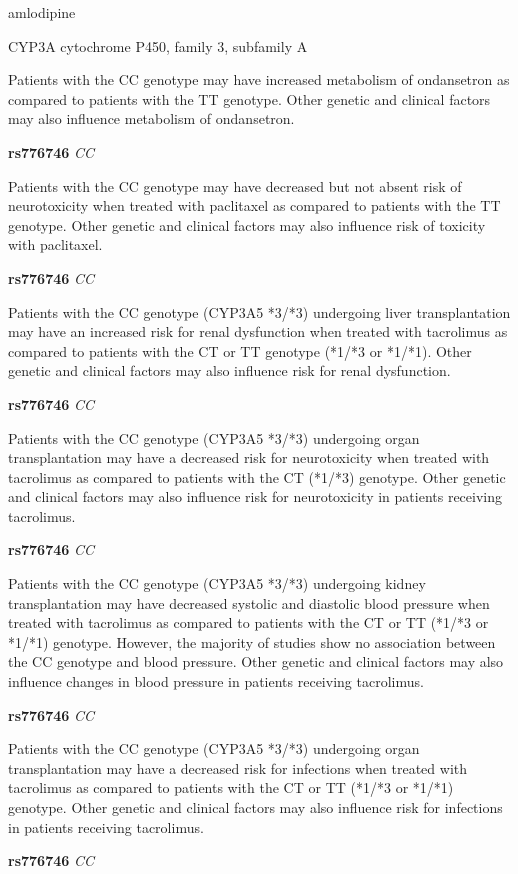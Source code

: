 \documentclass{resume} %
\begin{document}
\begin{rSection}{ amlodipine }
\begin{rSubsection}{ CYP3A }{ cytochrome P450, family 3, subfamily A }{}{}
\item[] Patients with the CC genotype may have increased metabolism of ondansetron as compared to patients with the TT genotype. Other genetic and clinical factors may also influence metabolism of ondansetron.\item \textbf{ rs776746 } \textit{ CC }
\item[] Patients with the CC genotype may have decreased but not absent risk of neurotoxicity when treated with paclitaxel as compared to patients with the TT genotype. Other genetic and clinical factors may also influence risk of toxicity with paclitaxel.\item \textbf{ rs776746 } \textit{ CC }
\item[] Patients with the CC genotype (CYP3A5 *3/*3) undergoing liver transplantation may have an increased risk for renal dysfunction when treated with tacrolimus as compared to patients with the CT or TT genotype (*1/*3 or *1/*1). Other genetic and clinical factors may also influence risk for renal dysfunction. \item \textbf{ rs776746 } \textit{ CC }
\item[] Patients with the CC genotype (CYP3A5 *3/*3) undergoing organ transplantation may have a decreased risk for neurotoxicity when treated with tacrolimus as compared to patients with the CT (*1/*3) genotype. Other genetic and clinical factors may also influence risk for neurotoxicity in patients receiving tacrolimus. \item \textbf{ rs776746 } \textit{ CC }
\item[] Patients with the CC genotype (CYP3A5 *3/*3) undergoing kidney transplantation may have decreased systolic and diastolic blood pressure when treated with tacrolimus as compared to patients with the CT or TT (*1/*3 or *1/*1) genotype. However, the majority of studies show no association between the CC genotype and blood pressure. Other genetic and clinical factors may also influence changes in blood pressure in patients receiving tacrolimus.\item \textbf{ rs776746 } \textit{ CC }
\item[] Patients with the CC genotype (CYP3A5 *3/*3) undergoing organ transplantation may have a decreased risk for infections when treated with tacrolimus as compared to patients with the CT or TT (*1/*3 or *1/*1) genotype. Other genetic and clinical factors may also influence risk for infections in patients receiving tacrolimus.\item \textbf{ rs776746 } \textit{ CC }

\end{rSubsection}
\end{rSection}
\end{document}
